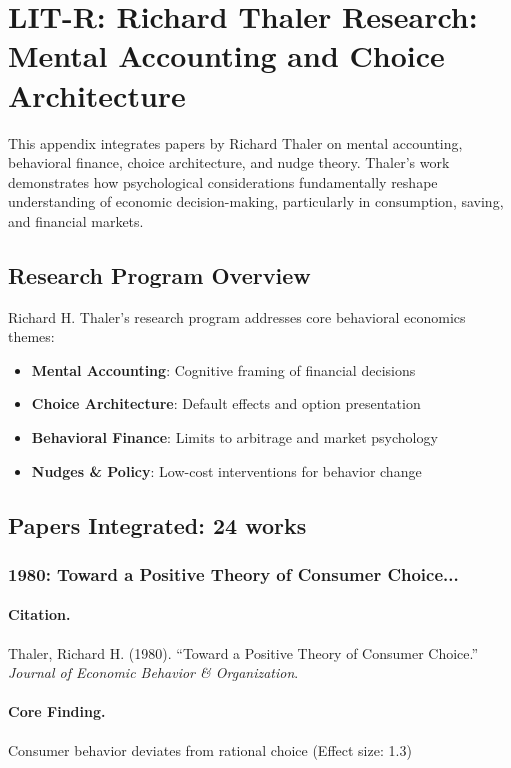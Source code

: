 \section{LIT-R: Richard Thaler Research: Mental Accounting and Choice Architecture}
\label{app:litr}

This appendix integrates papers by Richard Thaler on mental accounting,
behavioral finance, choice architecture, and nudge theory. Thaler's work demonstrates how
psychological considerations fundamentally reshape understanding of economic decision-making,
particularly in consumption, saving, and financial markets.

\subsection{Research Program Overview}

Richard H. Thaler's research program addresses core behavioral economics themes:

\begin{itemize}
  \item \textbf{Mental Accounting}: Cognitive framing of financial decisions
  \item \textbf{Choice Architecture}: Default effects and option presentation
  \item \textbf{Behavioral Finance}: Limits to arbitrage and market psychology
  \item \textbf{Nudges & Policy}: Low-cost interventions for behavior change
\end{itemize}

\subsection{Papers Integrated: 24 works}

\subsubsection{1980: Toward a Positive Theory of Consumer Choice...}

\paragraph{Citation.}
Thaler, Richard H. (1980). ``Toward a Positive Theory of Consumer Choice.''
\textit{Journal of Economic Behavior & Organization}.

\paragraph{Core Finding.}
Consumer behavior deviates from rational choice (Effect size: 1.3)


